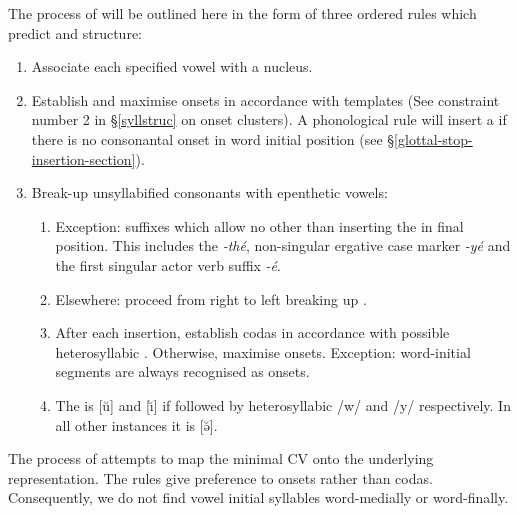 The process of  will be outlined here in the form of three ordered rules which predict  and  structure:

\begin{enumerate}
	\item Associate each specified vowel with a  nucleus.
	\item Establish and maximise onsets in accordance with  templates (See constraint number 2 in \S{}\ref{syllstruc} on onset clusters). A phonological rule will insert a  if there is no consonantal onset in word initial position (see \S{}\ref{glottal-stop-insertion-section}).
	\item Break-up unsyllabified consonants with epenthetic vowels:
	\begin{enumerate}
		\item Exception: suffixes which allow no other  than inserting the  in final position. This includes the  \emph{-thé}, non-singular ergative case marker \emph{-yé} and the first singular actor verb suffix \emph{-é}.
		\item Elsewhere: proceed from right to left breaking up .
		\item After each  insertion, establish codas in accordance with possible heterosyllabic . Otherwise, maximise onsets. Exception: word-initial segments are always recognised as onsets.
		\item The  is [ŭ] and [ı̆] if followed by heterosyllabic /w/ and /y/ respectively. In all other instances it is [ə̆].
	\end{enumerate}
\end{enumerate}

The process of  attempts to map the minimal  CV onto the underlying representation. The rules give preference to onsets rather than codas. Consequently, we do not find vowel initial syllables word-medially or word-finally.\\

